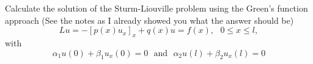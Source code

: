 \documentclass[12pt]{report}
\begin{document}
\newpage



\begin{problem}
    Calculate the solution of the Sturm-Liouville problem using the Green's function approach (See the notes as I already showed you what the answer should be)
    \[ 
        Lu = -[p(x)u_x]_x + q(x)u = f(x), ~~~ 0 \leq x \leq l,
    \]
    with 
    \[ 
        \alpha_1 u(0) + \beta_1u_x(0) = 0 ~~~ \text{and} ~~~ \alpha_2 u(l) + \beta_2 u_x(l) = 0 
    \]
\end{problem}

\begin{solution}


\end{solution}
\end{document}

